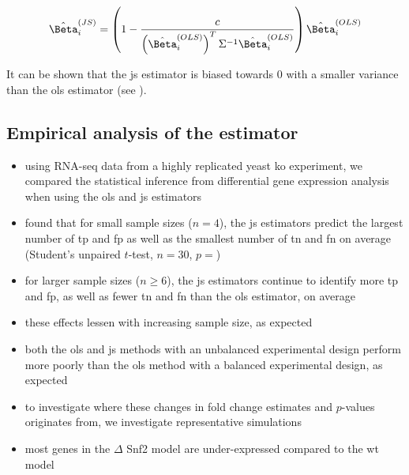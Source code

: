 \begin{equation*}
  \hat{\Beta}_i^{(JS)} = \left( 1 - \frac{c}{\left( \hat{\Beta}_i^{(OLS)} \right)^T \Sigma^{-1} \hat{\Beta}_i^{(OLS)}} \right) \hat{\Beta}_i^{(OLS)}
\end{equation*}

It can be shown that the \gls{js} estimator is biased towards 0 with a smaller variance than the \gls{ols} estimator (see ).

\subsection{Empirical analysis of the  estimator}

\begin{itemize}
  \item using RNA-seq data from a highly replicated yeast \gls{ko} experiment, we compared the statistical inference from differential gene expression analysis when using the \gls{ols} and \gls{js} estimators
  \item found that for small sample sizes ($n = 4$), the \gls{js} estimators predict the largest number of \gls{tp} and \gls{fp} as well as the smallest number of \gls{tn} and \gls{fn} on average (Student's unpaired $t$-test, $n = 30$, $p = $)
  \item for larger sample sizes ($n \ge 6$), the \gls{js} estimators continue to identify more \gls{tp} and \gls{fp}, as well as fewer \gls{tn} and \gls{fn} than the \gls{ols} estimator, on average
  \item these effects lessen with increasing sample size, as expected
  \item both the \gls{ols} and \gls{js} methods with an unbalanced experimental design perform more poorly than the \gls{ols} method with a balanced experimental design, as expected
\end{itemize}


\begin{itemize}
  \item to investigate where these changes in fold change estimates and $p$-values originates from, we investigate representative simulations
  \item most genes in the $\Delta$ Snf2 model are under-expressed compared to the \gls{wt} model 
\end{itemize}

